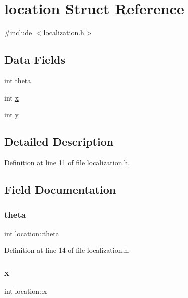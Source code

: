 \hypertarget{structlocation}{}\section{location Struct Reference}
\label{structlocation}


{\ttfamily \#include $<$localization.\+h$>$}

\subsection*{Data Fields}
\begin{DoxyCompactItemize}
\item 
int \hyperlink{structlocation_a4b415222b4dcf34e49dacd22384be9eb}{theta}
\item 
int \hyperlink{structlocation_aacd18b2506c49d221cfc37b2119e3c3c}{x}
\item 
int \hyperlink{structlocation_ad7197d1981d4ea5d8b36041473cac815}{y}
\end{DoxyCompactItemize}


\subsection{Detailed Description}


Definition at line 11 of file localization.\+h.



\subsection{Field Documentation}
\mbox{\label{structlocation_a4b415222b4dcf34e49dacd22384be9eb}} 
\subsubsection{\texorpdfstring{theta}{theta}}
{\footnotesize\ttfamily int location\+::theta}



Definition at line 14 of file localization.\+h.

\mbox{\label{structlocation_aacd18b2506c49d221cfc37b2119e3c3c}} 
\subsubsection{\texorpdfstring{x}{x}}
{\footnotesize\ttfamily int location\+::x}



